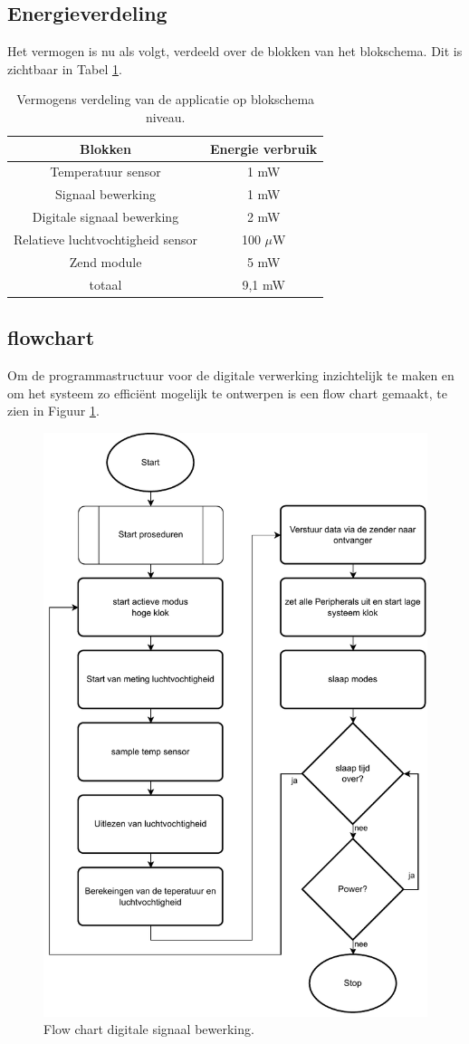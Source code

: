 \subsection{Energieverdeling}
Het vermogen is nu als volgt, verdeeld over de blokken van het blokschema. Dit is zichtbaar in Tabel \ref{tab:Energie_verbruik_blok_schema}.
\begin{table}[H]
    \centering
    \begin{tabular}{|c|c|}
        \hline
        \textbf{Blokken} & \textbf{Energie verbruik} \\ \hline
        Temperatuur sensor & 1 mW \\ \hline
        Signaal bewerking  & 1 mW \\ \hline
        Digitale signaal bewerking & 2 mW \\ \hline
        Relatieve luchtvochtigheid sensor & 100 $\mu$W \\ \hline
        Zend module & 5 mW \\ \hline
        totaal  & 9,1 mW \\ \hline

    \end{tabular}
    \caption{Vermogens verdeling van de applicatie op blokschema niveau.}
    \label{tab:Energie_verbruik_blok_schema}
\end{table}

\newpage
\subsection{flowchart}  %
Om de programmastructuur voor de digitale verwerking inzichtelijk te maken en om het systeem zo efficiënt mogelijk te ontwerpen is een flow chart gemaakt, te zien in Figuur \ref{fig:flow_chart}.
\newline
\begin{figure}[H]
    \centering
    \includegraphics[width=0.65\linewidth]{pictures/jochem_flowchart.drawio.pdf}
    \caption{Flow chart digitale signaal bewerking.}
    \label{fig:flow_chart}
\end{figure}

